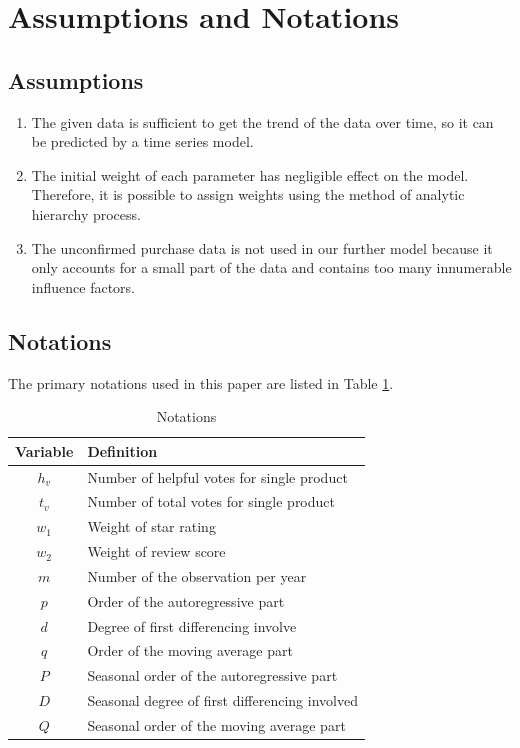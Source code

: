 \documentclass[12pt]{article}  %
\begin{document}
\section{Assumptions and Notations}
\subsection{Assumptions}     
\begin{enumerate}[\bfseries 1.]
    \item The given data is sufficient to get the trend of the data over time, so it can be predicted by a time series model.
    \item The initial weight of each parameter has negligible effect on the model. Therefore, it is possible to assign weights using the method of analytic hierarchy process.
    \item The unconfirmed purchase data is not used in our further model because it only accounts for a small part of the data and contains too many innumerable influence factors.
\end{enumerate}

\subsection{Notations}
The primary notations used in this paper are listed in Table \ref{tb:notation}.
\begin{table}[!htbp]
\begin{center}
\caption{Notations}
\begin{tabular}{cl}
	\toprule
	\multicolumn{1}{m{3cm}}{\centering Variable}
	&\multicolumn{1}{m{8cm}}{\centering Definition}\\
	\midrule
	$h_v$& Number of helpful votes for single product\\
	$t_v$& Number of total votes for single product\\
    $w_1$& Weight of star rating\\
	$w_2$& Weight of review score\\
	$m$  & Number of the observation per year\\
    $p$  & Order of the autoregressive part\\
    $d$  & Degree of first differencing involve\\
    $q$  & Order of the moving average part\\
    $P$  & Seasonal order of the autoregressive part\\
    $D$  & Seasonal degree of first differencing involved\\
    $Q$  & Seasonal order of the moving average part\\
	\bottomrule
\end{tabular}\label{tb:notation}
\end{center}
\end{table}
\end{document}
